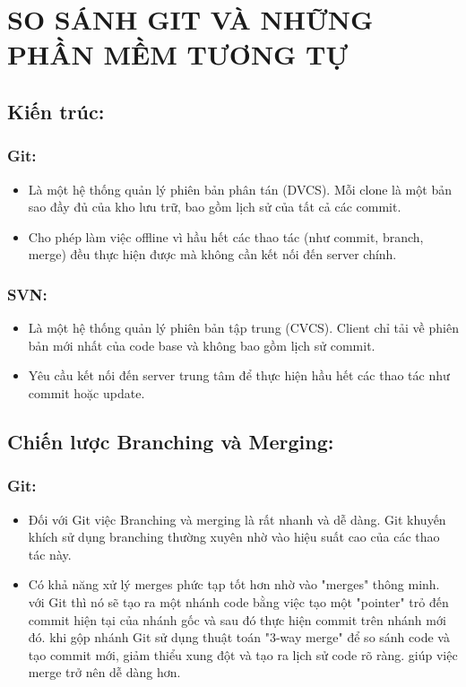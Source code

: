 \chapter{SO SÁNH GIT VÀ NHỮNG PHẦN MỀM TƯƠNG TỰ}
\section{Kiến trúc:}
\subsection{Git:}
\begin{itemize}
    \item Là một hệ thống quản lý phiên bản phân tán (DVCS). Mỗi clone là một bản sao đầy đủ của kho lưu trữ, bao gồm lịch sử của tất cả các commit.
    \item Cho phép làm việc offline vì hầu hết các thao tác (như commit, branch, merge) đều thực hiện được mà không cần kết nối đến server chính.
\end{itemize}

\subsection{SVN:}
\begin{itemize}
    \item Là một hệ thống quản lý phiên bản tập trung (CVCS). Client chỉ tải về phiên bản mới nhất của code base và không bao gồm lịch sử commit.
    \item Yêu cầu kết nối đến server trung tâm để thực hiện hầu hết các thao tác như commit hoặc update.
\end{itemize}

\section{Chiến lược Branching và Merging:}
\subsection{Git:}
\begin{itemize}
    \item Đối với Git việc Branching và merging là rất nhanh và dễ dàng. Git khuyến khích sử dụng branching thường xuyên nhờ vào hiệu suất cao của các thao tác này.
    \item Có khả năng xử lý merges phức tạp tốt hơn nhờ vào "merges" thông minh.
    với Git thì nó sẽ tạo ra một nhánh code bằng việc tạo một "pointer" trỏ đến commit hiện tại của nhánh gốc và sau đó thực hiện commit trên nhánh mới đó. 
    khi gộp nhánh Git sử dụng thuật toán "3-way merge" để so sánh code và tạo commit mới, giảm thiểu xung đột và tạo ra lịch sử code rõ ràng.
    giúp việc merge trở nên dễ dàng hơn.
\end{itemize}


